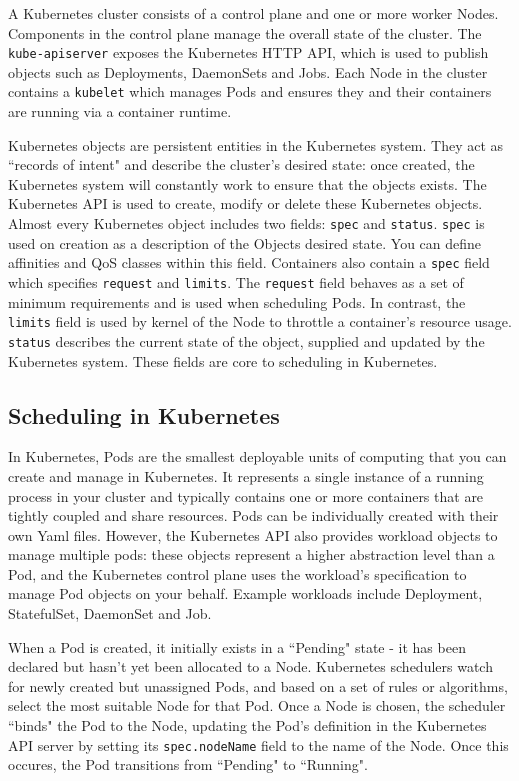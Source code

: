 A Kubernetes cluster consists of a control plane and one or more worker Nodes.
Components in the control plane manage the overall state of the cluster. The
\verb|kube-apiserver| exposes the Kubernetes HTTP API, which is used to publish
objects such as Deployments, DaemonSets and Jobs. Each
Node in the cluster contains a \verb|kubelet| which manages Pods and ensures
they and their containers are running via a container runtime.

Kubernetes objects are persistent entities in the Kubernetes system. They act as
``records of intent" and describe the cluster's desired state: once created, the
Kubernetes system will constantly work to ensure that the objects exists. The
Kubernetes API is used to create, modify or delete these Kubernetes objects. Almost
every Kubernetes object includes two fields: \verb|spec| and \verb|status|.
\verb|spec| is used on creation as a description of the Objects desired state.
You can define affinities and QoS classes within this field. Containers also
contain a \verb|spec| field which specifies \verb|request| and
\verb|limits|. The \texttt{request} field behaves as a set of minimum
requirements and is used when scheduling Pods. In contrast, the \texttt{limits}
field is used by kernel of the Node to throttle a container's resource usage.
\verb|status| describes the current state of the object, supplied and updated by
the Kubernetes system. These fields are core to scheduling in Kubernetes.

\subsection{Scheduling in Kubernetes}
In Kubernetes, Pods are the smallest deployable units of computing that you can
create and manage in Kubernetes. It represents a single instance of a running
process in your cluster and typically contains one or more containers that are
tightly coupled and share resources. Pods can be individually created with their
own Yaml files. However, the Kubernetes API also provides workload objects to
manage multiple pods: these objects represent a higher abstraction level than a
Pod, and the Kubernetes control plane uses the workload's specification to
manage Pod objects on your behalf. Example workloads include Deployment,
StatefulSet, DaemonSet and Job.

When a Pod is created, it initially exists in a ``Pending" state - it has been
declared but hasn't yet been allocated to a Node. Kubernetes schedulers watch for
newly created but unassigned Pods, and based on a set of
rules or algorithms, select the most suitable Node for that Pod. Once a Node is
chosen, the scheduler ``binds" the Pod to the Node, updating the Pod's definition
in the Kubernetes API server by setting its \verb|spec.nodeName| field to the
name of the Node. Once this occures, the Pod transitions from ``Pending" to
``Running".

